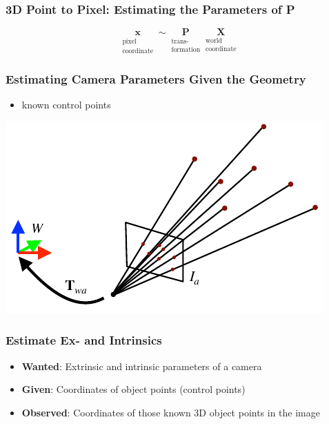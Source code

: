 \begin{frame}
  \frametitle{3D Point to Pixel: Estimating the Parameters of P}
  \begin{equation*}
    \underset{\substack{\text{pixel}\\ \text{coordinate}}}{\mathbf{x}} \sim \underset{\substack{\text{trans-}\\ \text{formation}}}{\mathbf{P}}
    \underset{\substack{\text{world}\\ \text{coordinate}}}{\mathbf{X}}
  \end{equation*}  
\end{frame}

\begin{frame}
  \frametitle{Estimating Camera Parameters Given the Geometry}
  \begin{itemize}
    \item known control points
  \end{itemize}
  \begin{center}
    \includegraphics[width=0.5\columnwidth]{./images/localization_3d_2d.pdf}
  \end{center}
\end{frame}

\begin{frame}
  \frametitle{Estimate Ex- and Intrinsics}
  \begin{itemize}
    \item \textbf{Wanted}: Extrinsic and intrinsic parameters of a camera
    \item \textbf{Given}: Coordinates of object points (control points)
    \item \textbf{Observed}: Coordinates of those known 3D object points in the image
  \end{itemize}
\end{frame}

